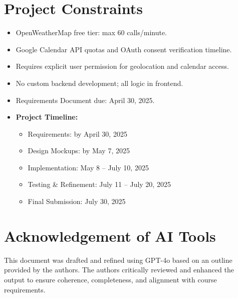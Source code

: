 \documentclass[12pt,a4paper]{article}
\begin{document}
\section{Project Constraints}
\begin{itemize}[nosep]
  \item OpenWeatherMap free tier: max 60 calls/minute.
  \item Google Calendar API quotas and OAuth consent verification timeline.
  \item Requires explicit user permission for geolocation and calendar access.
  \item No custom backend development; all logic in frontend.
  \item Requirements Document due: April 30, 2025.
  \item \textbf{Project Timeline:}
  \begin{itemize}[nosep]
    \item Requirements: by April 30, 2025
    \item Design Mockups: by May 7, 2025
    \item Implementation: May 8 – July 10, 2025
    \item Testing \& Refinement: July 11 – July 20, 2025
    \item Final Submission: July 30, 2025
  \end{itemize}
\end{itemize}


\section{Acknowledgement of AI Tools}
This document was drafted and refined using GPT-4o based on an outline provided by the authors. The authors critically reviewed and enhanced the output to ensure coherence, completeness, and alignment with course requirements.
\end{document}
